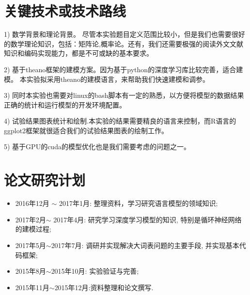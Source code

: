 \documentclass[12pt,a4paper]{article}
\begin{document}
\section{关键技术或技术路线}
1) 数学背景和理论背景。 尽管本实验题目定义范围比较小，但是我们也需要很好的数学理论知识，包括：矩阵论,概率论。还有，我们还需要极强的阅读外文文献知识和编码实现能力，都是不可或缺的基本要求。

2) 基于theano框架的建模方案。因为基于python的深度学习库比较完善，适合建模。 本实验拟采用theano的建模语言，来帮助我们快速建模和调参。

3) 同时本实验也需要对linux的bash脚本有一定的熟悉，以方便将模型的数据结果正确的统计和运行模型的开发环境配置。

4) 试验结果图表统计和绘制.本实验的结果需要精良的语言来控制，而R语言的ggplot2框架就很适合我们的试验结果图表的绘制工作。

5) 基于GPU的cuda的模型优化也是我们需要考虑的问题之一。
\section{论文研究计划}
\begin{itemize}
  \item 2016年12月 $\sim$ 2017年1月: 整理资料，学习研究语言模型的领域知识;
  \item 2017年2月$\sim$ 2017年4月: 研究学习深度学习模型的知识, 特别是循环神经网络的建模过程;
  \item 2017年5月$\sim$2017年7月: 调研并实现解决大词表问题的主要手段, 并实现基本代码框架;
  \item 2015年8月$\sim$2015年10月: 实验验证与完善;
  \item 2015年11月$\sim$2015年12月:资料整理和论文撰写.
\end{itemize}



\newpage
{}

\end{document}
